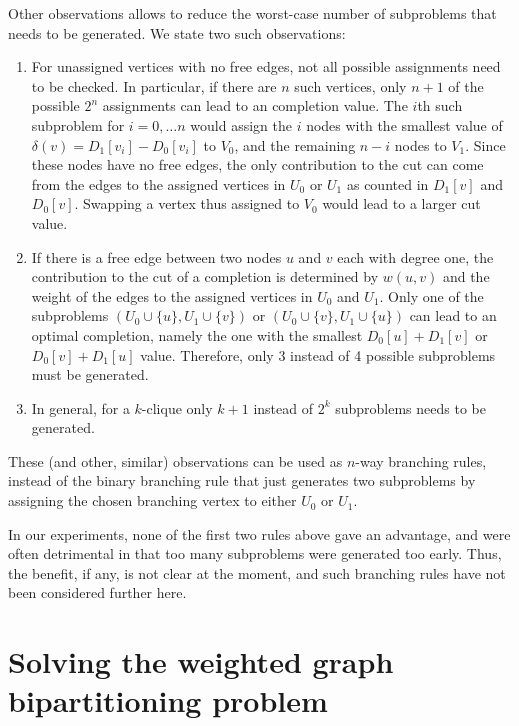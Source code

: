 \documentclass[a4paper,11pt]{article}
\begin{document}
Other observations allows to reduce the worst-case number of
subproblems that needs to be generated. We state two such
observations:
\begin{enumerate}
\item
  For unassigned vertices with no free edges, not all possible
  assignments need to be checked. In particular, if there are $n$ such
  vertices, only $n+1$ of the possible $2^n$ assignments can lead to
  an completion value. The $i$th such subproblem for $i=0,\ldots n$
  would assign the $i$ nodes with the smallest value of
  $\delta(v)=D_1[v_i]-D_0[v_i]$ to $V_0$, and the remaining $n-i$ nodes
  to $V_1$. Since these nodes have no free edges, the only
  contribution to the cut can come from the edges to the assigned
  vertices in $U_0$ or $U_1$ as counted in $D_1[v]$ and
  $D_0[v]$. Swapping a vertex thus assigned to $V_0$ would lead to a
  larger cut value.
\item
  If there is a free edge between two nodes $u$ and $v$ each with degree
  one, the contribution to the cut of a completion is determined by
  $w(u,v)$ and the weight of the edges to the assigned vertices in $U_0$
  and $U_1$. Only one of the subproblems $(U_0\cup\{u\},U_1\cup\{v\})$
  or $(U_0\cup\{v\},U_1\cup\{u\})$ can lead to an optimal completion,
  namely the one with the smallest $D_0[u]+D_1[v]$ or $D_0[v]+D_1[u]$
  value. Therefore, only 3 instead of 4 possible subproblems must be
  generated.
\item
  In general, for a $k$-clique only $k+1$ instead of $2^k$ subproblems
  needs to be generated.
\end{enumerate}
These (and other, similar) observations can be used as
$n$-way branching rules, instead of the binary branching rule that
just generates two subproblems by assigning the chosen branching
vertex to either $U_0$ or $U_1$.

In our experiments, none of the first two rules above gave an
advantage, and were often detrimental in that too many subproblems
were generated too early. Thus, the benefit, if any, is not clear at
the moment, and such branching rules have not been considered further
here.

\section{Solving the weighted graph bipartitioning problem}
\end{document}
